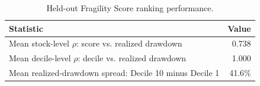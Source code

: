 \begin{table}[!htbp]
\centering
\footnotesize
\caption{Held-out Fragility Score ranking performance.}
\label{tab:fragility-score-performance}
\begin{tabular}{lr}
\toprule
Statistic & Value \\
\midrule
Mean stock-level $\rho$: score vs. realized drawdown & 0.738 \\
Mean decile-level $\rho$: decile vs. realized drawdown & 1.000 \\
Mean realized-drawdown spread: Decile 10 minus Decile 1 & 41.6\% \\
\bottomrule
\end{tabular}
\end{table}

